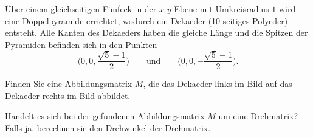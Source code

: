 Über einem gleichseitigen Fünfeck in der $x$-$y$-Ebene mit Umkreisradius $1$ 
wird eine Doppelpyramide errichtet, wodurch ein Dekaeder (10-seitiges Polyeder) entsteht.
Alle Kanten des Dekaeders haben die gleiche Länge und die Spitzen der Pyramiden befinden sich
in den Punkten 
\[
\biggl(0,0,\frac{\sqrt{5}-1}{2}\biggr)
\qquad\text{und}\qquad
\biggl(0,0,-\frac{\sqrt{5}-1}{2}\biggr).
\]

\begin{center}
\end{center}

\begin{teilaufgaben}
\item
Finden Sie eine Abbildungsmatrix $M$, die das Dekaeder links im Bild auf das
Dekaeder rechts im Bild abbildet.
\item
Handelt es sich bei der gefundenen Abbildungsmatrix $M$ um eine Drehmatrix?
Falls ja, berechnen sie den Drehwinkel der Drehmatrix.
\end{teilaufgaben}


